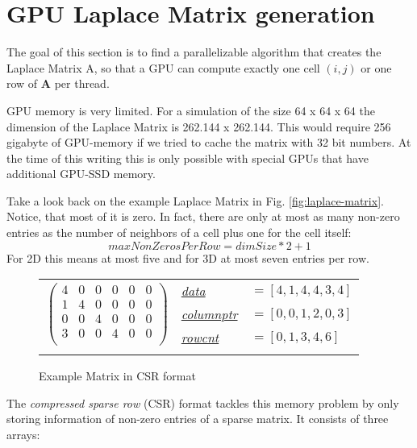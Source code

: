 \section{GPU Laplace Matrix generation}
The goal of this section is to find a parallelizable algorithm that creates the Laplace Matrix A, so that a GPU can compute exactly one cell $(i,j)$ or one row of \textbf{A} per thread.
\par GPU memory is very limited. For a simulation of the size 64 x 64 x 64 the dimension of the Laplace Matrix is 262.144 x 262.144. This would require 256 gigabyte of GPU-memory if we tried to cache the matrix with 32 bit numbers. At the time of this writing this is only possible with special GPUs that have additional GPU-SSD memory.
\par Take a look back on the example Laplace Matrix in Fig. \ref{fig:laplace-matrix}. Notice, that most of it is zero. In fact, there are only at most as many non-zero entries as the number of neighbors of a cell plus one for the cell itself:
\begin{equation}
	maxNonZerosPerRow = dimSize * 2 + 1
\end{equation}
For 2D this means at most five and for 3D at most seven entries per row.
\newpage
\begin{figure*}
	\centering
	\begin{tabular}{lll}
	\multirow{3}{*}{$\left( {\begin{array}{cccccc}
   4 & 0 & 0 & 0 & 0 & 0  \\
   1 & 4 & 0 & 0 & 0 & 0  \\
   0 & 0 & 4 & 0 & 0 & 0  \\
   3 & 0 & 0 & 4 & 0 & 0  \\
  \end{array} } \right)$}
	& \hyperref[csr-data]{\textit{data}} & $=[4,1,4,4,3,4]$  \\
	& \hyperref[csr-columnptr]{\textit{columnptr}} & $=[0,0,1,2,0,3]$ \\
	& \hyperref[csr-rowcnt]{\textit{rowcnt}} & $=[0,1,3,4,6]$ \\
	& & 
	\end{tabular}
\caption{Example Matrix in CSR format}\label{fig:csr-matrix}
\end{figure*}
\par The \textit{compressed sparse row} (CSR) \parencite{tinney1967direct} format tackles this memory problem by only storing information of non-zero entries of a sparse matrix. It consists of three arrays:\\\\
